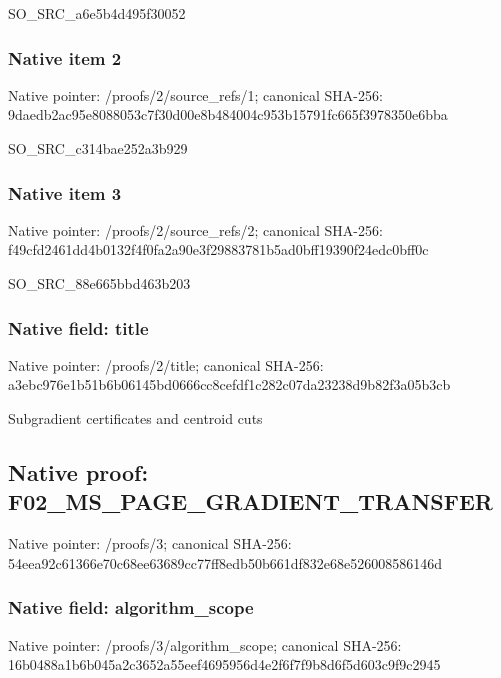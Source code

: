 \documentclass[10pt,a4paper]{article}
\begin{document}
\begingroup\raggedright\sloppy SO\_\allowbreak{}SRC\_\allowbreak{}a6e5b4d495f30052\par\endgroup

\subsubsection{Native item 2}
Native pointer: /proofs/2/source\_\allowbreak{}refs/1; canonical SHA-256: 9daedb2ac95e8088053c7f30d00e8b484004c953b15791fc665f3978350e6bba

\begingroup\raggedright\sloppy SO\_\allowbreak{}SRC\_\allowbreak{}c314bae252a3b929\par\endgroup

\subsubsection{Native item 3}
Native pointer: /proofs/2/source\_\allowbreak{}refs/2; canonical SHA-256: f49cfd2461dd4b0132f4f0fa2a90e3f29883781b5ad0bff19390f24edc0bff0c

\begingroup\raggedright\sloppy SO\_\allowbreak{}SRC\_\allowbreak{}88e665bbd463b203\par\endgroup

\subsubsection{Native field: title}
Native pointer: /proofs/2/title; canonical SHA-256: a3ebc976e1b51b6b06145bd0666cc8cefdf1c282c07da23238d9b82f3a05b3cb

\begingroup\raggedright\sloppy Subgradient certificates and centroid cuts\par\endgroup

\subsection{Native proof: F02\_\allowbreak{}MS\_\allowbreak{}PAGE\_\allowbreak{}GRADIENT\_\allowbreak{}TRANSFER}
Native pointer: /proofs/3; canonical SHA-256: 54eea92c61366e70c68ee63689cc77ff8edb50b661df832e68e526008586146d

\subsubsection{Native field: algorithm\_\allowbreak{}scope}
Native pointer: /proofs/3/algorithm\_\allowbreak{}scope; canonical SHA-256: 16b0488a1b6b045a2c3652a55eef4695956d4e2f6f7f9b8d6f5d603c9f9c2945
\end{document}

